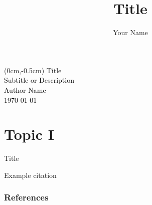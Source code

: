 \documentclass[aspectratio=169]{beamer}
\title{Title}
\author{Your Name}
\institute[Tohoku University]{Tohoku University} %
\begin{document}
{
\begin{frame}

\begin{textblock*}{12cm}(0cm,-0.5cm) %
    \textcolor{tupurple}{\Large Title} \\[0.5cm]
    \textcolor{black}{Subtitle or Description}\\[2cm]
    \textcolor{black}{\footnotesize Author Name \\ \today}
\end{textblock*}
\end{frame}
}


\section{Topic I}

\begin{frame}{Title}

Example citation \cite{kirch2025}

\end{frame}


\begin{frame}[allowframebreaks]
        \frametitle{References}
        
        
\end{frame}
\end{document}
